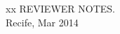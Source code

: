 \begin{center}
  {\color{white} xx}\vfill
  REVIEWER NOTES.\\
  Recife, Mar 2014
\end{center}
\newpage 